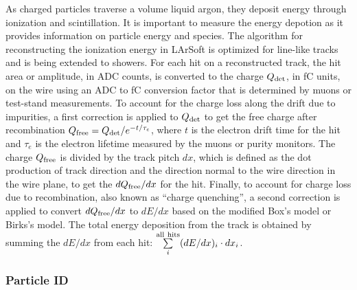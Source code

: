 As charged particles traverse a volume liquid argon, they deposit
energy through ionization and scintillation. It is important to
measure the energy depotion as it provides information on particle
energy and species. The algorithm for reconstructing the ionization
energy in LArSoft is optimized for line-like tracks and is being
extended to showers. 
For each hit on a reconstructed track, the hit area or amplitude, in ADC counts, is
converted to the charge $Q_{\rm{det}}$, in fC units, on the wire using an
ADC to fC conversion factor that is determined by muons or test-stand
measurements. To account for the charge loss along the drift due to
impurities, a first correction is applied to $Q_{\rm{det}}$ to get the free
charge after recombination $Q_{\rm{free}} = Q_{\rm{det}}/e^{-t/\tau_{e}}$, where
$t$ is the electron drift time for the hit and $\tau_{e}$ is the
electron lifetime measured by the muons or purity monitors. The charge
$Q_{\rm{free}}$ is divided by the track pitch $dx$, which is defined as the
dot production of track direction and the direction normal to the wire
direction in the wire plane, to get the $dQ_{\rm{free}}/dx$ for the
hit. Finally, to account for charge loss due to recombination, also
known as ``charge quenching'', a second correction is applied to
convert $dQ_{\rm{free}}/dx$ to $dE/dx$ based on the modified Box's model
\cite{box} or Birks's model\cite{birks}. The total energy
deposition from the track is obtained by summing the $dE/dx$ from each
hit: $\sum\limits_{i}^{\rm{all\ hits}}(dE/dx)_{i}\cdot dx_{i}$.

%



\subsubsection{Particle ID}

